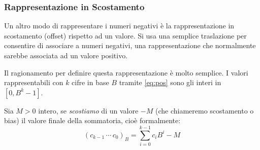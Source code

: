 \subsubsection{Rappresentazione in Scostamento}

Un altro modo di rappresentare i numeri negativi è la rappresentazione in scostamento (offset) rispetto ad un valore. Si usa una semplice traslazione
per consentire di associare a numeri negativi, una rappresentazione che normalmente sarebbe associata ad un valore positivo.
 
Il ragionamento per definire questa rappresentazione è molto semplice. I valori
rappresentabili con $k$ cifre in base $B$ tramite \eqref{eq:pos} sono gli interi in $[0,B^k-1]$. 

Sia $M > 0$ intero, se \emph{scostiamo} di un valore $-M$ (che chiameremo scostamento o bias) il valore finale della sommatoria, cioè formalmente:
\[ (c_{k-1}\,\cdots\,c_{0})_B = \sum_{i=0}^{k-1} c_iB^i - M \] 




